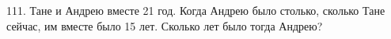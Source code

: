 111. Тане и Андрею вместе 21 год. Когда Андрею было столько, сколько Тане сейчас, им вместе было 15 лет. Сколько лет было тогда Андрею?\\

